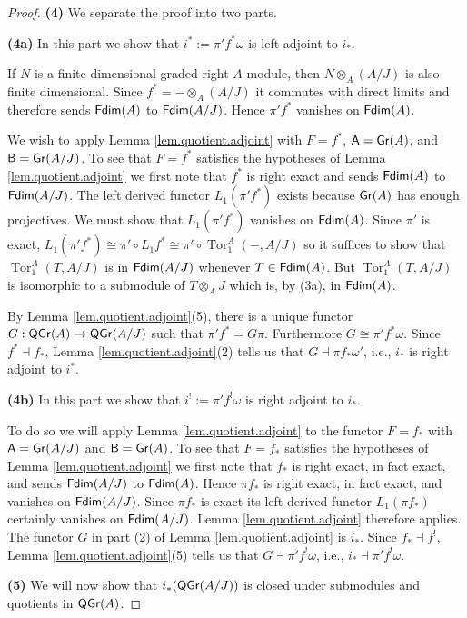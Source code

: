 \documentclass[10pt]{amsart}
\numberwithin{equation}{section}
\def\Tor{\operatorname {Tor}}
\def\Fdim{{\sf Fdim}}
\def\Gr{{\sf Gr}}
\def\QGr{\operatorname{\sf QGr}}
\def\sA{{\sf A}}
\def\sB{{\sf B}}
\begin{document}
\begin{proof}
{\bf (4)} 
We separate the proof into two parts.

{\bf (4a)}
In this part we show that $i^*:=\pi' f^* \omega$ is left adjoint to $i_*$.  

If $N$ is a finite dimensional graded right $A$-module, then $N \otimes_A (A/J)$ is also finite dimensional. 
Since $f^*=- \otimes_A (A/J)$ it commutes with direct limits 
and therefore sends $\Fdim(A)$ to $\Fdim(A/J)$. Hence $\pi'f^*$ vanishes on $\Fdim(A)$.


We wish to apply Lemma \ref{lem.quotient.adjoint} with $F= f^*$, $\sA=\Gr(A)$, and $\sB=\Gr(A/J)$. 
To see that $F=f^*$ satisfies the hypotheses of Lemma \ref{lem.quotient.adjoint} we first note that $f^*$ is right exact 
and sends $\Fdim(A)$ to $\Fdim(A/J)$. The left derived functor $L_1(\pi'f^*)$ exists because $\Gr(A)$ has enough
projectives. We must show that $L_1(\pi'f^*)$  vanishes on $\Fdim(A)$.  
 Since $\pi'$ is exact, $L_1(\pi' f^*) \cong \pi' \circ L_1f^* \cong \pi' \circ \Tor^A_1(-,A/J)$ 
so it suffices to show that $\Tor^A_1(T,A/J)$ is in $\Fdim(A/J)$ whenever $T \in \Fdim(A)$.  
But $\Tor^A_1(T,A/J)$ is isomorphic to a submodule of $T \otimes_A J$ which is, by (3a), in $\Fdim(A)$. 


By Lemma \ref{lem.quotient.adjoint}(5), there is a unique functor $G:\QGr(A) \to \QGr(A/J)$ such that 
$\pi'f^*=G\pi$. Furthermore $G \cong  \pi'f^*\omega$. Since $f^* \dashv f_*$,  Lemma \ref{lem.quotient.adjoint}(2)
tells us that $G\dashv \pi f_*\omega'$, i.e., $i_*$ is right adjoint to $i^*$. 

{\bf (4b)}
In this part we show that $i^!:=\pi'f^!\omega$ is right adjoint to $i_*$.
 
To do so we will apply Lemma \ref{lem.quotient.adjoint} to the functor $F= f_*$ with $\sA=\Gr(A/J)$ and $\sB=\Gr(A)$.
To see that $F=f_*$ satisfies the hypotheses of Lemma \ref{lem.quotient.adjoint} we first note that $f_*$ is right exact, in fact exact, and
sends $\Fdim(A/J)$ to $\Fdim(A)$. Hence $\pi f_*$ is right exact, in fact exact, and 
 vanishes on $\Fdim(A/J)$. Since $\pi f_*$ is exact its left derived functor $L_1(\pi f_*)$  
 certainly vanishes on $\Fdim(A/J)$. Lemma \ref{lem.quotient.adjoint} therefore applies. The functor $G$ in part (2) of 
 Lemma \ref{lem.quotient.adjoint} is $i_*$.
  Since $f_* \dashv f^!$, Lemma \ref{lem.quotient.adjoint}(5) tells us that $G \dashv \pi' f^!\omega$, i.e., $i_* \dashv \pi' f^!\omega$. 


{\bf (5)}  
We will now show that  $i_*(\QGr(A/J))$ is closed under submodules and quotients in $\QGr(A)$.
  

\end{proof}
\end{document}
